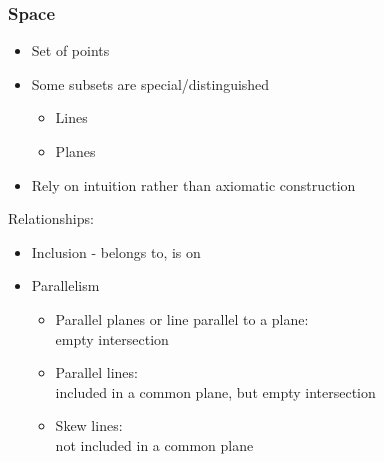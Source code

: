 \begin{frame}
 \frametitle{Space}

  \begin{itemize}
      \item Set of points
      \item Some subsets are special/distinguished
      \begin{itemize}
	  \item Lines
	  \item Planes
      \end{itemize}
      \item Rely on intuition rather than axiomatic construction
  \end{itemize}

\pause

  Relationships:
  \begin{itemize}
   \item Inclusion - belongs to, is on
   \item Parallelism
      \begin{itemize}
	\item Parallel planes or line parallel to a plane: \\
	      empty intersection
	\item Parallel lines: \\
	      included in a common plane, but empty intersection
	\item Skew lines: \\
	      not included in a common plane
      \end{itemize}
  \end{itemize}

\end{frame}
